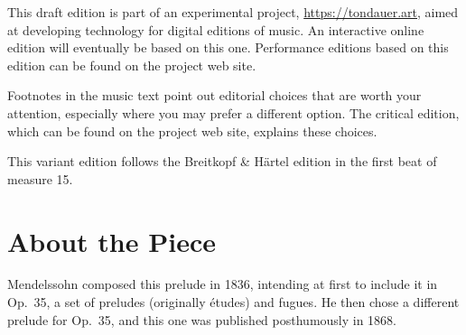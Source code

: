 \documentclass[a4paper, 12pt]{book}
\begin{document}
This draft edition is part of an experimental project,
\url{https://tondauer.art}, aimed at developing technology for digital
editions of music.
\ifdef{\critical}
  {%
    An interactive online edition will eventually be based on this
    one. Performance editions based on this edition can be found on
    the project web site.
  }{%
    
    Footnotes in the music text point out editorial choices that are
    worth your attention, especially where you may prefer a different
    option. The critical edition, which can be found on the project
    web site, explains these choices.

  }

  \ifdef{\variant}
    {%
      This variant edition follows the Breitkopf \& Härtel edition in
      the first beat of measure 15.
    }{}


\section*{About the Piece}

Mendelssohn composed this prelude in 1836, intending at first to
include it in Op.\ 35, a set of preludes (originally études) and
fugues. He then chose a different prelude for Op.\ 35, and this one
was published posthumously in 1868.\autocite[188--198]{todd_2008}
\end{document}
